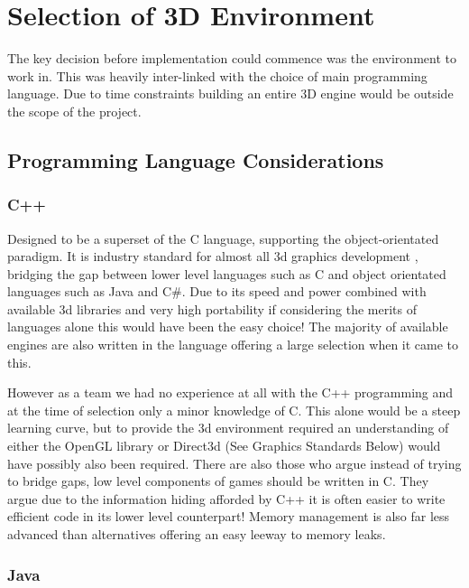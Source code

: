 
\section{Selection of 3D Environment}

The key decision before implementation could commence was the environment
to work in. This was heavily inter-linked with the choice of main
programming language. Due to time constraints building an entire 3D
engine would be outside the scope of the project.


\subsection{Programming Language Considerations}


\subsubsection{C++}

Designed to be a superset of the C language, supporting the object-orientated
paradigm. It is industry standard for almost all 3d graphics development
\cite{Wilson2006}, bridging the gap between lower level languages
such as C and object orientated languages such as Java and C\#. Due
to its speed and power combined with available 3d libraries and very
high portability if considering the merits of languages alone this
would have been the easy choice! The majority of available engines
are also written in the language offering a large selection when it
came to this.

However as a team we had no experience at all with the C++ programming
and at the time of selection only a minor knowledge of C. This alone
would be a steep learning curve, but to provide the 3d environment
required an understanding of either the OpenGL library or Direct3d
(See Graphics Standards Below) would have possibly also been required.
There are also those who argue instead of trying to bridge gaps, low
level components of games should be written in C. They argue due to
the information hiding afforded by C++ it is often easier to write
efficient code in its lower level counterpart!\cite{Wilson2006} Memory
management is also far less advanced than alternatives offering an
easy leeway to memory leaks.


\subsubsection{Java}

